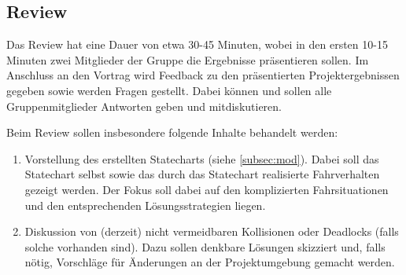 


\subsection{Review}
Das Review hat eine Dauer von etwa 30-45 Minuten, wobei in den ersten 10-15 Minuten zwei Mitglieder der Gruppe die Ergebnisse präsentieren sollen. Im Anschluss an den Vortrag wird Feedback zu den präsentierten Projektergebnissen gegeben sowie werden Fragen gestellt. Dabei können und sollen alle Gruppenmitglieder Antworten geben und mitdiskutieren.

Beim Review sollen insbesondere folgende Inhalte behandelt werden:
\begin{enumerate}
	\setlength\topsep{-1em}
	\setlength\itemsep{-0.5em}
	\item Vorstellung des erstellten Statecharts (siehe \autoref{subsec:mod}). 
	Dabei soll das State\-chart selbst sowie das durch das Statechart realisierte Fahrverhalten gezeigt werden. 
	Der Fokus soll dabei auf den komplizierten Fahrsituationen und den entsprechenden Lösungsstrategien liegen.
	\item Diskussion von (derzeit) nicht vermeidbaren Kollisionen oder Deadlocks (falls solche vorhanden sind). 
	Dazu sollen denkbare Lösungen skizziert und, falls nötig, Vorschläge für Änderungen an der Projektumgebung gemacht werden.
\end{enumerate}




